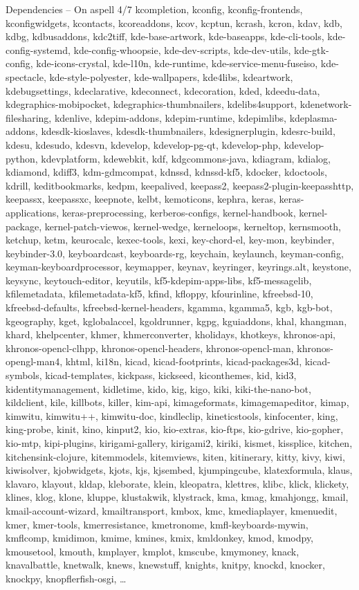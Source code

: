 \documentclass{beamer}
\begin{document}
\begin{frame}{Dependencies – On aspell 4/7}
\tiny kcompletion, kconfig, kconfig-frontends, kconfigwidgets, kcontacts, kcoreaddons, kcov, kcptun, kcrash, kcron, kdav, kdb, kdbg, kdbusaddons, kdc2tiff, kde-base-artwork, kde-baseapps, kde-cli-tools, kde-config-systemd, kde-config-whoopsie, kde-dev-scripts, kde-dev-utils, kde-gtk-config, kde-icons-crystal, kde-l10n, kde-runtime, kde-service-menu-fuseiso, kde-spectacle, kde-style-polyester, kde-wallpapers, kde4libs, kdeartwork, kdebugsettings, kdeclarative, kdeconnect, kdecoration, kded, kdeedu-data, kdegraphics-mobipocket, kdegraphics-thumbnailers, kdelibs4support, kdenetwork-filesharing, kdenlive, kdepim-addons, kdepim-runtime, kdepimlibs, kdeplasma-addons, kdesdk-kioslaves, kdesdk-thumbnailers, kdesignerplugin, kdesrc-build, kdesu, kdesudo, kdesvn, kdevelop, kdevelop-pg-qt, kdevelop-php, kdevelop-python, kdevplatform, kdewebkit, kdf, kdgcommons-java, kdiagram, kdialog, kdiamond, kdiff3, kdm-gdmcompat, kdnssd, kdnssd-kf5, kdocker, kdoctools, kdrill, keditbookmarks, kedpm, keepalived, keepass2, keepass2-plugin-keepasshttp, keepassx, keepassxc, keepnote, kelbt, kemoticons, kephra, keras, keras-applications, keras-preprocessing, kerberos-configs, kernel-handbook, kernel-package, kernel-patch-viewos, kernel-wedge, kerneloops, kerneltop, kernsmooth, ketchup, ketm, keurocalc, kexec-tools, kexi, key-chord-el, key-mon, keybinder, keybinder-3.0, keyboardcast, keyboards-rg, keychain, keylaunch, keyman-config, keyman-keyboardprocessor, keymapper, keynav, keyringer, keyrings.alt, keystone, keysync, keytouch-editor, keyutils, kf5-kdepim-apps-libs, kf5-messagelib, kfilemetadata, kfilemetadata-kf5, kfind, kfloppy, kfourinline, kfreebsd-10, kfreebsd-defaults, kfreebsd-kernel-headers, kgamma, kgamma5, kgb, kgb-bot, kgeography, kget, kglobalaccel, kgoldrunner, kgpg, kguiaddons, khal, khangman, khard, khelpcenter, khmer, khmerconverter, kholidays, khotkeys, khronos-api, khronos-opencl-clhpp, khronos-opencl-headers, khronos-opencl-man, khronos-opengl-man4, khtml, ki18n, kicad, kicad-footprints, kicad-packages3d, kicad-symbols, kicad-templates, kickpass, kickseed, kiconthemes, kid, kid3, kidentitymanagement, kidletime, kido, kig, kigo, kiki, kiki-the-nano-bot, kildclient, kile, killbots, killer, kim-api, kimageformats, kimagemapeditor, kimap, kimwitu, kimwitu++, kimwitu-doc, kindleclip, kineticstools, kinfocenter, king, king-probe, kinit, kino, kinput2, kio, kio-extras, kio-ftps, kio-gdrive, kio-gopher, kio-mtp, kipi-plugins, kirigami-gallery, kirigami2, kiriki, kismet, kissplice, kitchen, kitchensink-clojure, kitemmodels, kitemviews, kiten, kitinerary, kitty, kivy, kiwi, kiwisolver, kjobwidgets, kjots, kjs, kjsembed, kjumpingcube, klatexformula, klaus, klavaro, klayout, kldap, kleborate, klein, kleopatra, klettres, klibc, klick, klickety, klines, klog, klone, kluppe, klustakwik, klystrack, kma, kmag, kmahjongg, kmail, kmail-account-wizard, kmailtransport, kmbox, kmc, kmediaplayer, kmenuedit, kmer, kmer-tools, kmerresistance, kmetronome, kmfl-keyboards-mywin, kmflcomp, kmidimon, kmime, kmines, kmix, kmldonkey, kmod, kmodpy, kmousetool, kmouth, kmplayer, kmplot, kmscube, kmymoney, knack, knavalbattle, knetwalk, knews, knewstuff, knights, knitpy, knockd, knocker, knockpy, knopflerfish-osgi, …

\end{frame}
\end{document}

